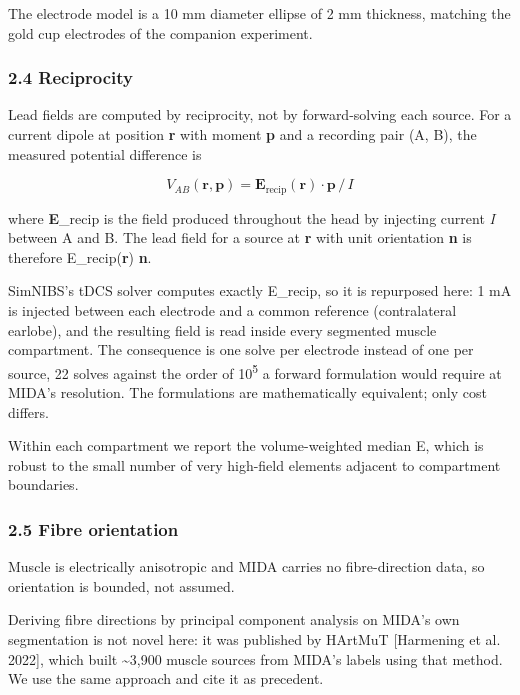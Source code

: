\documentclass[manuscript,review,anonymous]{acmart}
\begin{document}
The electrode model is a 10 mm diameter ellipse of 2 mm thickness, matching the
gold cup electrodes of the companion experiment.

\subsubsection{2.4 Reciprocity}\label{reciprocity}

Lead fields are computed by reciprocity, not by forward-solving each source. For
a current dipole at position \textbf{r} with moment \textbf{p} and a recording pair (A,
B), the measured potential difference is

\[V_{AB}(\mathbf{r}, \mathbf{p}) = \mathbf{E}_{\mathrm{recip}}(\mathbf{r}) \cdot \mathbf{p} \, / \, I\]

where \textbf{E}\_recip is the field produced throughout the head by injecting current
\emph{I} between A and B. The lead field for a source at \textbf{r} with unit orientation
\textbf{n} is therefore E\_recip(\textbf{r}) \textperiodcentered{} \textbf{n}.

SimNIBS's tDCS solver computes exactly E\_recip, so it is repurposed here: 1 mA
is injected between each electrode and a common reference (contralateral
earlobe), and the resulting field is read inside every segmented muscle
compartment. The consequence is one solve per electrode instead of one per
source, 22 solves against the order of 10\textsuperscript{5} a forward formulation would require
at MIDA's resolution. The formulations are mathematically equivalent; only cost
differs.

Within each compartment we report the volume-weighted median \textbar E\textbar, which is
robust to the small number of very high-field elements adjacent to compartment
boundaries.

\subsubsection{2.5 Fibre orientation}\label{fibre-orientation}

Muscle is electrically anisotropic and MIDA carries no fibre-direction data, so
orientation is bounded, not assumed.

Deriving fibre directions by principal component analysis on MIDA's own
segmentation is not novel here: it was published by HArtMuT {[}Harmening et al.
2022{]}, which built \textasciitilde3,900 muscle sources from MIDA's labels using that method.
We use the same approach and cite it as precedent.
\end{document}

